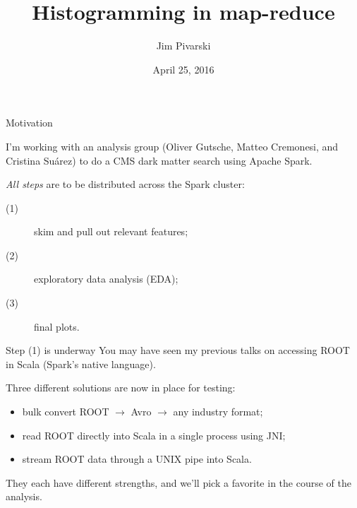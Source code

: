 \documentclass{beamer}
\title[2016-04-25-histogrammar]{Histogramming in map-reduce}
\author{Jim Pivarski}
\institute{Princeton University -- DIANA}
\date{April 25, 2016}
\begin{document}
\begin{frame}
  \titlepage
\end{frame}


\begin{frame}{Motivation}

I'm working with an analysis group (Oliver Gutsche, Matteo Cremonesi, and Cristina Su\'arez) to do a CMS dark matter search using Apache Spark.

\vspace{0.5 cm}
{\it All steps} are to be distributed across the Spark cluster:

\begin{description}
\item[(1)] skim and pull out relevant features;
\item[(2)] exploratory data analysis (EDA);
\item[(3)] final plots.
\end{description}

\end{frame}

\begin{frame}{Step (1) is underway}
You may have seen my previous talks on accessing ROOT in Scala (Spark's native language).

\vspace{0.5 cm}
Three different solutions are now in place for testing:

\begin{itemize}
\item bulk convert ROOT $\to$ Avro $\to$ any industry format;
\item read ROOT directly into Scala in a single process using JNI;
\item stream ROOT data through a UNIX pipe into Scala.
\end{itemize}

\vspace{0.5 cm}
They each have different strengths, and we'll pick a favorite in the course of the analysis.
\end{frame}
\end{document}
